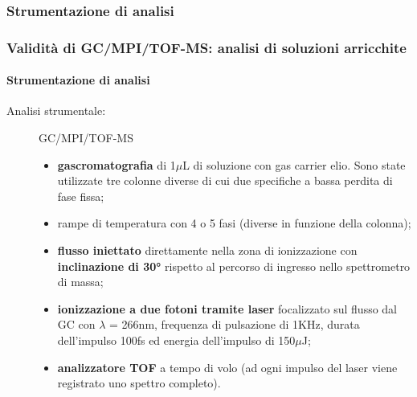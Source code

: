 \subsubsection{Strumentazione di analisi}\begin{frame}\frametitle{Validità di GC/MPI/TOF-MS: analisi di soluzioni arricchite}\framesubtitle{Strumentazione di analisi}
\begin{description}

\item [{Analisi strumentale:}] GC/MPI/TOF-MS \begin{itemize}\pause
                                              \item {\bf gascromatografia} di 1$\mu$L di soluzione con gas carrier elio. Sono state utilizzate tre colonne diverse di cui due specifiche a bassa perdita di fase fissa;
                                              \item rampe di temperatura con 4 o 5 fasi (diverse in funzione della colonna);\pause
                                              \item {\bf flusso iniettato} direttamente nella zona di ionizzazione con {\bf inclinazione di 30°} rispetto al percorso di ingresso nello spettrometro di massa;
                                              \item {\bf ionizzazione a due fotoni tramite laser} focalizzato sul flusso dal GC con $\lambda$ = 266nm, frequenza di pulsazione di 1KHz, durata dell'impulso 100fs ed energia dell'impulso di 150$\mu$J;\pause
                                              \item {\bf analizzatore TOF} a tempo di volo (ad ogni impulso del laser viene registrato uno spettro completo).
 \end{itemize}\end{description}
\end{frame}



